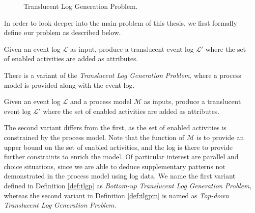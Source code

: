 \begin{figure}
    \centering
    \caption{Translucent Log Generation Problem.}
    \label{fig:enter-label}
\end{figure}


In order to look deeper into the main problem of this thesis, we first formally define our problem as described below. \\

\begin{definition}
\label{def:tlgp}
    Given an event log $\mathcal{L}$ as input, produce a translucent event log $\mathcal{L'}$ where the set of enabled activities are added as attributes. 
\end{definition}

There is a variant of the \emph{Translucent Log Generation Problem}, where a process model is provided along with the event log. \\

\begin{definition}
\label{def:tlgpm}
    Given an event log $\mathcal{L}$ and a process model $\mathcal{M}$ as inputs, produce a translucent event log $\mathcal{L'}$ where the set of enabled activities are added as attributes. 
\end{definition}

The second variant differs from the first, as the set of enabled activities is constrained by the process model. Note that the function of $\mathcal{M}$ is to provide an upper bound on the set of enabled activities, and the log is there to provide further constraints to enrich the model. Of particular interest are parallel and choice situations, since we are able to deduce supplementary patterns not demonstrated in the process model using log data. We name the first variant defined in Definition \ref{def:tlgp} as \emph{Bottom-up Translucent Log Generation Problem}, whereas the second variant in Definition \ref{def:tlgpm} is named as \emph{Top-down Translucent Log Generation Problem.}

